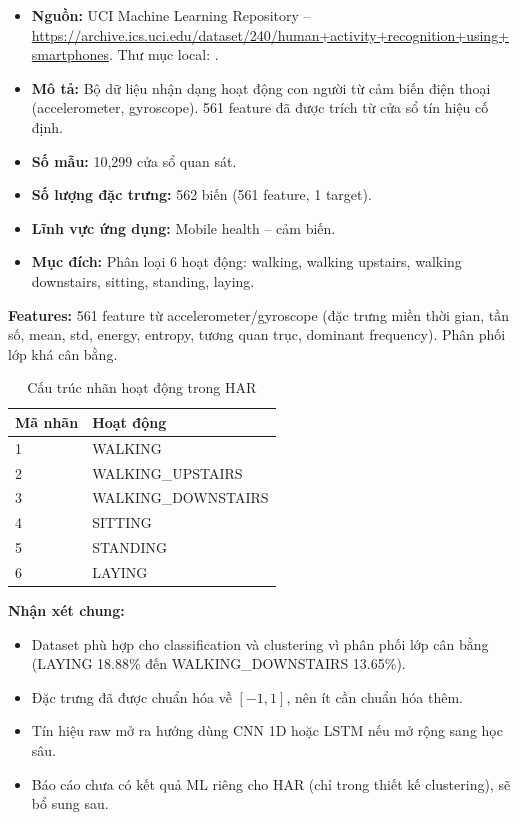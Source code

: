 \begin{itemize}
 \item \textbf{Nguồn:} UCI Machine Learning Repository -- \url{https://archive.ics.uci.edu/dataset/240/human+activity+recognition+using+smartphones}. Thư mục local: .
 \item \textbf{Mô tả:} Bộ dữ liệu nhận dạng hoạt động con người từ cảm biến điện thoại (accelerometer, gyroscope). 561 feature đã được trích từ cửa sổ tín hiệu cố định.
 \item \textbf{Số mẫu:} 10,299 cửa sổ quan sát.
 \item \textbf{Số lượng đặc trưng:} 562 biến (561 feature, 1 target).
 \item \textbf{Lĩnh vực ứng dụng:} Mobile health -- cảm biến.
 \item \textbf{Mục đích:} Phân loại 6 hoạt động: walking, walking upstairs, walking downstairs, sitting, standing, laying.
\end{itemize}

\textbf{Features:} 561 feature từ accelerometer/gyroscope (đặc trưng miền thời gian, tần số, mean, std, energy, entropy, tương quan trục, dominant frequency). Phân phối lớp khá cân bằng.

\begin{table}[H]
\centering
\caption{Cấu trúc nhãn hoạt động trong HAR}
\label{tab:har_activity_labels}
\small
\begin{tabular}{ll}
\toprule
Mã nhãn & Hoạt động \\
\midrule
1 & WALKING \\
2 & WALKING\_UPSTAIRS \\
3 & WALKING\_DOWNSTAIRS \\
4 & SITTING \\
5 & STANDING \\
6 & LAYING \\
\bottomrule
\end{tabular}
\end{table}

\textbf{Nhận xét chung:}
\begin{itemize}
 \item Dataset phù hợp cho classification và clustering vì phân phối lớp cân bằng (LAYING 18.88\% đến WALKING\_DOWNSTAIRS 13.65\%).
 \item Đặc trưng đã được chuẩn hóa về $[-1,1]$, nên ít cần chuẩn hóa thêm.
 \item Tín hiệu raw mở ra hướng dùng CNN 1D hoặc LSTM nếu mở rộng sang học sâu.
 \item Báo cáo chưa có kết quả ML riêng cho HAR (chỉ trong thiết kế clustering), sẽ bổ sung sau.
\end{itemize}

